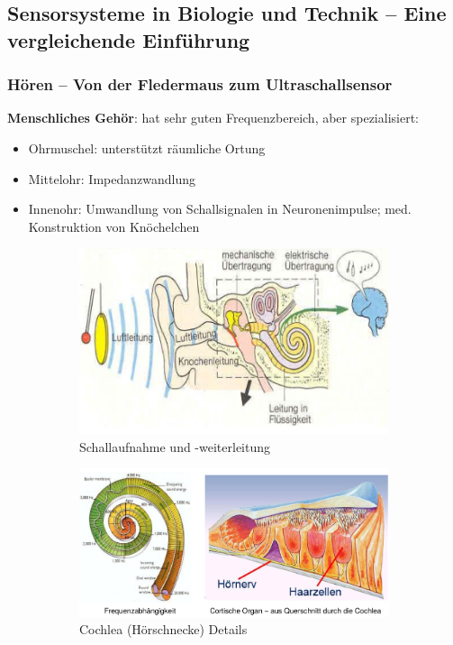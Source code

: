 \subsection{Sensorsysteme in Biologie und Technik – Eine vergleichende Einführung}
\subsubsection{Hören – Von der Fledermaus zum Ultraschallsensor}
\textbf{Menschliches Gehör}:
hat sehr guten Frequenzbereich, aber spezialisiert:
\begin{itemize}
\item Ohrmuschel: unterstützt räumliche Ortung
\item Mittelohr: Impedanzwandlung
\item Innenohr: Umwandlung von Schallsignalen in Neuronenimpulse; med. Konstruktion von Knöchelchen
\end{itemize}
\begin{figure}[h!]
	\begin{subfigure}{.5\textwidth}
		\includegraphics[width=\linewidth]{figures/ch04_schall.png}
		\caption{Schallaufnahme und -weiterleitung}
	\end{subfigure}
	\begin{subfigure}{.5\textwidth}
		\includegraphics[width=\linewidth]{figures/ch04_cochlea.png}
		\caption{Cochlea (H\"{o}rschnecke) Details}
	\end{subfigure}
	\caption{}
	\label{hoeren}
\end{figure}
